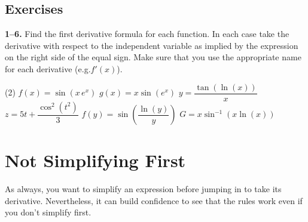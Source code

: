 \documentclass[10pt,oneside,]{book}
\theoremstyle{plain}
\theoremstyle{definition}
\numberwithin{equation}{section}
\newcommand{\fe}[2]{#1\mathopen{}\left(#2\right)\mathclose{}}
\newcommand{\fd}[1]{#1'}
\begin{document}
\subsection[Exercises]{Exercises}\label{exercises-44}
\textbf{1--6. }\hypertarget{exercisegroup-94}{\null}Find the first derivative formula for each function.  In each case take the derivative with respect to the independent variable as implied by the expression on the right side of the equal sign.  Make sure that you use the appropriate name for each derivative (e.g.\@ \(\fe{\fd{f}}{x}\)).%
\par
\begin{exercisegroup}(2)
\exercise[1.]\hypertarget{exercise-456}{\null}\(\fe{f}{x}=\fe{\sin}{x\,e^x}\)%
\exercise[2.]\hypertarget{exercise-457}{\null}\(\fe{g}{x}=x\fe{\sin}{e^x}\)%
\exercise[3.]\hypertarget{exercise-458}{\null}\(y=\dfrac{\fe{\tan}{\fe{\ln}{x}}}{x}\)%
\exercise[4.]\hypertarget{exercise-459}{\null}\(z=5t+\dfrac{\fe{\cos^2}{t^2}}{3}\)%
\exercise[5.]\hypertarget{exercise-460}{\null}\(\fe{f}{y}=\fe{\sin}{\dfrac{\fe{\ln}{y}}{y}}\)%
\exercise[6.]\hypertarget{exercise-461}{\null}\(G=x\fe{\sin^{-1}}{x\fe{\ln}{x}}\)%
\end{exercisegroup}
\par\smallskip\noindent
\typeout{************************************************}
\typeout{************************************************}
\section[Not Simplifying First]{Not Simplifying First}\label{section-not-simplifying-first}
As always, you want to simplify an expression before jumping in to take its derivative.  Nevertheless, it can build confidence to see that the rules work even if you don't simplify first.%
\typeout{************************************************}
\typeout{************************************************}
\end{document}
